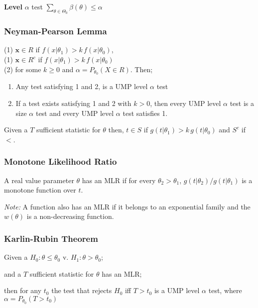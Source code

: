 		\textbf{Level} \(\alpha\) test \(\sum_{\theta\in\Theta_0} \beta(\theta) \leq \alpha\)
			
		\subsubsection{Neyman-Pearson Lemma}
			(1) \(\mathbf{x}\in R\) if \(f(x|\theta_1) > k\, f(x|\theta_0) \),	\\
			(1) \(\mathbf{x}\in R^c\) if \(f(x|\theta_1) > k\, f(x|\theta_0) \)	\\
			(2) for some \(k\geq0\) and \(\alpha=P_{\theta_0}(X\in R)\). Then;
			\begin{enumerate}
				\item Any test satisfying 1 and 2, is a UMP level \(\alpha\) test
				\item If a test exists satisfying 1 and 2 with \(k>0\),
					then every UMP level \(\alpha\) test is a size \(\alpha\) test
					and every UMP level \(\alpha\) test satisfies 1.
			\end{enumerate}
			
			Given a \(T\) sufficient statistic for \(\theta\)
			then, \(t\in S\) if \(g(t|\theta_1) > k\, g(t|\theta_0)\)
			and \(S^c\) if \(<\).
		
		\subsubsection{Monotone Likelihood Ratio}
		A real value parameter \(\theta\) has an MLR if 
		for every \(\theta_2>\theta_1\),
		\(g(t|\theta_2)/g(t|\theta_1)\)
		is a monotone function over \(t\).
		
		\textit{Note:}
		A function also has an MLR if it belongs to an exponential family and the 
		\(w(\theta)\) is a non-decreasing function.
		
		\subsubsection{Karlin-Rubin Theorem}
		Given a \(H_0:\theta\leq\theta_0\) v. \(H_1:\theta>\theta_0\);
		
		and a \(T\) sufficient statistic for \(\theta\) has an MLR;
		
		then for any \(t_0\) the test that rejects \(H_0\)
		iff \(T>t_0\) is a UMP level \(\alpha\) test, 
		where \(\alpha = P_{\theta_0}(T>t_0)\)
		
		
